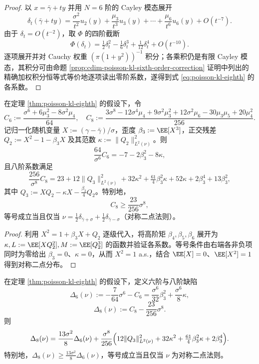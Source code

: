\begin{proof}
以 \(x=\bar\gamma+ty\) 并用 \(N=6\) 阶的 Cayley 模态展开
\[
\delta_t(\bar\gamma+ty)
=\frac{\sigma^2}{t^2}u_2(y)+\frac{\mu_3}{t^3}u_3(y)+\cdots+\frac{\mu_6}{t^6}u_6(y)+O(t^{-7}).
\]
由于 \(\delta_t=O(t^{-2})\)，取 \(\Phi\) 的四阶截断
\[
\Phi(\delta_t)=\tfrac12\delta_t^2-\tfrac16\delta_t^3+\tfrac{1}{12}\delta_t^4+O(t^{-10}).
\]
逐项展开并对 Cauchy 权重 \((\pi(1+y^2))^{-1}\) 积分；各乘积仍是有限 Cayley 模态，其积分可由命题 \ref{prop:cdim-poisson-kl-sixth-order-correction} 证明中列出的精确加权积分恒等式等价地逐项读出零阶系数，遂得到式 \eqref{eq:poisson-kl-eighth} 的各系数。
\end{proof}

\begin{theorem}[双层缺陷阶梯]\label{thm:poisson-defect-ladder}
在定理 \ref{thm:poisson-kl-eighth} 的假设下，令
\[
C_6:=\frac{\sigma^6+6\mu_3^2-8\sigma^2\mu_4}{64},
\quad
C_8:=\frac{3\sigma^8-12\sigma^4\mu_4+9\sigma^2\mu_3^2+12\sigma^2\mu_6-30\mu_3\mu_5+20\mu_4^2}{256}.
\]
记归一化随机变量 \(X:=(\gamma-\bar\gamma)/\sigma\)，歪度 \(\beta_3:=\EE[X^3]\)，正交残差 \(Q_2:=X^2-1-\beta_3 X\) 及其范数 \(\kappa:=\|Q_2\|_{L^2(\nu)}^2\)。则
\[
\frac{64}{\sigma^6}C_6=-7-2\beta_3^2-8\kappa,
\]
且八阶系数满足
\[
\frac{256}{\sigma^8}C_8
=23+12\|Q_3\|_{L^2(\nu)}^2+32\kappa^2+\tfrac{61}{4}\beta_3^2\kappa+52\kappa+2\beta_3^4+13\beta_3^2,
\]
其中 \(Q_3:=XQ_2-\kappa X-\frac{\beta_3}{4}Q_2\)。特别地，
\[
C_8\ge\frac{23}{256}\sigma^8,
\]
等号成立当且仅当 \(\nu=\frac12\delta_{\bar\gamma+\sigma}+\frac12\delta_{\bar\gamma-\sigma}\)（对称二点法则）。
\end{theorem}

\begin{proof}
利用 \(X^2=1+\beta_3 X+Q_2\) 逐级代入，将高阶矩 \(\beta_4,\beta_5,\beta_6\) 展开为 \(\kappa,L:=\EE[XQ_2^2],M:=\EE[Q_2^3]\) 的函数并验证各系数。等号条件由右端各非负项同时为零给出 \(\beta_3=0\)、\(\kappa=0\)，从而 \(X^2=1\) a.s.，结合 \(\EE[X]=0\)、\(\EE[X^2]=1\) 得到对称二点分布。
\end{proof}

\begin{theorem}[缺陷放大]\label{thm:poisson-defect-amplification}
在定理 \ref{thm:poisson-kl-eighth} 的假设下，定义六阶与八阶缺陷
\[
\Delta_6(\nu):=-\frac{7}{64}\sigma^6-C_6=\frac{\sigma^6}{32}\beta_3^2+\frac{\sigma^6}{8}\kappa,
\]
\[
\Delta_8(\nu):=C_8-\frac{23}{256}\sigma^8.
\]
则
\begin{equation}\label{eq:defect-amplification}
\Delta_8(\nu)
=\frac{13\sigma^2}{8}\Delta_6(\nu)
+\frac{\sigma^8}{256}\Bigl(
12\|Q_3\|_{L^2(\nu)}^2
+32\kappa^2
+\tfrac{61}{4}\beta_3^2\kappa
+2\beta_3^4
\Bigr).
\end{equation}
特别地，\(\Delta_8(\nu)\ge\frac{13\sigma^2}{8}\Delta_6(\nu)\)，等号成立当且仅当 \(\nu\) 为对称二点法则。
\end{theorem}

